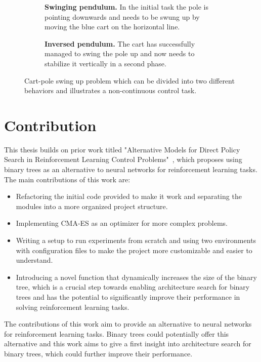 \begin{figure}[!ht]
    \centering
    \begin{subfigure}{.48\textwidth}
        \centering
        \caption{\textbf{Swinging pendulum.} In the initial task the pole is pointing downwards and needs to be swung up by moving the blue cart on the horizontal line.} 
        \label{swing_up_initial}
    \end{subfigure}%
    \hspace{1em}
    \begin{subfigure}{.48\textwidth}
        \centering
        \caption{\textbf{Inversed pendulum.} The cart has successfully managed to swing the pole up and now needs to stabilize it vertically in a second phase.} 
        \label{swing_up_running}
    \end{subfigure}
    \caption{Cart-pole swing up problem which can be divided into two different behaviors and illustrates a non-continuous control task.}
    \label{fig:swing_up}
\end{figure}


\section{Contribution}

This thesis builds on prior work titled "Alternative Models for Direct Policy Search in Reinforcement Learning Control Problems"~\cite{masanti_alternative_2022}, which proposes using binary trees as an alternative to neural networks for reinforcement learning tasks. The main contributions of this work are:

\begin{itemize}
\item Refactoring the initial code provided to make it work and separating the modules into a more organized project structure.
\item Implementing CMA-ES as an optimizer for more complex problems.
\item Writing a setup to run experiments from scratch and using two environments with configuration files to make the project more customizable and easier to understand.
\item Introducing a novel function that dynamically increases the size of the binary tree, which is a crucial step towards enabling architecture search for binary trees and has the potential to significantly improve their performance in solving reinforcement learning tasks.
\end{itemize}

The contributions of this work aim to provide an alternative to neural networks for reinforcement learning tasks. Binary trees could potentially offer this alternative and this work aims to give a first insight into architecture search for binary trees, which could further improve their performance.
